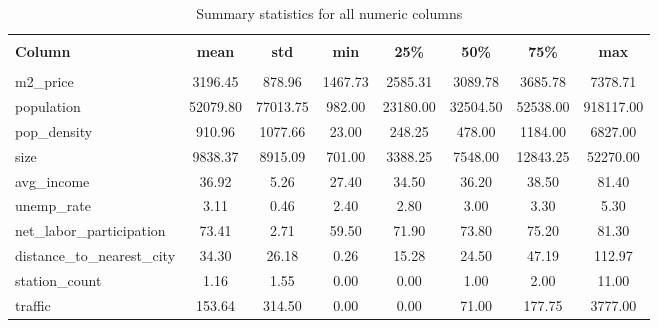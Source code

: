 
    \begin{table}
      \centering 
      \caption{Summary statistics for all numeric columns} 
      \vspace{10pt}
      \label{tab:summary_statistics} 
      \begin{tabular}{@{\extracolsep{5pt}} lccccccc} 
      \hline 
      \hline \\[-1.8ex] 
      \textbf{Column} & \textbf{mean} & \textbf{std} & \textbf{min} & \textbf{25\%} & \textbf{50\%} & \textbf{75\%} & \textbf{max} \\ 
      \hline \\[-1.8ex] 
    m2\_price & 3196.45 & 878.96 & 1467.73 & 2585.31 & 3089.78 & 3685.78 & 7378.71 \\ 
population & 52079.80 & 77013.75 & 982.00 & 23180.00 & 32504.50 & 52538.00 & 918117.00 \\ 
pop\_density & 910.96 & 1077.66 & 23.00 & 248.25 & 478.00 & 1184.00 & 6827.00 \\ 
size & 9838.37 & 8915.09 & 701.00 & 3388.25 & 7548.00 & 12843.25 & 52270.00 \\ 
avg\_income & 36.92 & 5.26 & 27.40 & 34.50 & 36.20 & 38.50 & 81.40 \\ 
unemp\_rate & 3.11 & 0.46 & 2.40 & 2.80 & 3.00 & 3.30 & 5.30 \\ 
net\_labor\_participation & 73.41 & 2.71 & 59.50 & 71.90 & 73.80 & 75.20 & 81.30 \\ 
distance\_to\_nearest\_city & 34.30 & 26.18 & 0.26 & 15.28 & 24.50 & 47.19 & 112.97 \\ 
station\_count & 1.16 & 1.55 & 0.00 & 0.00 & 1.00 & 2.00 & 11.00 \\ 
traffic & 153.64 & 314.50 & 0.00 & 0.00 & 71.00 & 177.75 & 3777.00 \\ 

      \hline 
      \hline 
      \end{tabular} 
    \end{table} 
    
